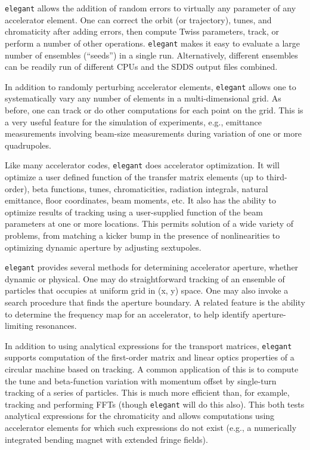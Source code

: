 \documentclass[11pt]{article}
\begin{document}
{\tt elegant} allows the addition of random errors to virtually any
parameter of any accelerator element.  One can correct the orbit (or
trajectory), tunes, and chromaticity after adding errors, then compute
Twiss parameters, track, or perform a number of other operations.
{\tt elegant} makes it easy to evaluate a large number of ensembles (``seeds'')
in a single run.  Alternatively, different ensembles can be readily run
of different CPUs and the SDDS output files combined.

In addition to randomly perturbing accelerator elements, {\tt elegant}
allows one to systematically vary any number of elements in a
multi-dimensional grid.  As before, one can track or do other
computations for each point on the grid.  This is a very useful
feature for the simulation of experiments, e.g., emittance
measurements involving beam-size measurements during variation of one
or more quadrupoles\cite{Borland_PC}.

Like many accelerator codes, {\tt elegant} does accelerator
optimization.  It will optimize a user defined function of the
transfer matrix elements (up to third-order), beta functions, tunes,
chromaticities, radiation integrals, natural emittance, floor
coordinates, beam moments, etc.  It also has the ability to optimize results of
tracking using a user-supplied function of the beam parameters at one
or more locations.  This permits solution of a wide variety of
problems, from matching a kicker bump in the presence of
nonlinearities to optimizing dynamic aperture by adjusting sextupoles.

{\tt elegant} provides several methods for determining accelerator
aperture, whether dynamic or physical.  One may do straightforward
tracking of an ensemble of particles that occupies at uniform grid in
(x, y) space.  One may also invoke a search procedure that finds the
aperture boundary.  A related feature is the ability to determine
the frequency map for an accelerator, to help identify aperture-limiting
resonances.

In addition to using analytical expressions for the transport
matrices, {\tt elegant} supports computation of the first-order matrix
and linear optics properties of a circular machine based on tracking.
A common application of this is to compute the tune and beta-function
variation with momentum offset by single-turn tracking of a series of
particles.  This is much more efficient than, for example, tracking
and performing FFTs (though {\tt elegant} will do this also).  This
both tests analytical expressions for the chromaticity and allows
computations using accelerator elements for which such expressions do
not exist (e.g., a numerically integrated bending magnet with extended
fringe fields).
\end{document}
